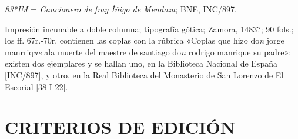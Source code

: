 \documentclass[11pt,a4paper,twoside]{article}
\newcommand{\comillas}[1]{«#1»}
\begin{document}
\textit{83*IM} = \textit{Cancionero de fray Íñigo de Mendoza}; BNE, INC/897.

Impresión incunable a doble columna; tipografía gótica; Zamora, 1483?; 90 fols.; los ff. 67r.-70r. contienen las coplas con la rúbrica \comillas{Coplas que hizo do\textit{n} jorge manrriq\textit{ue} ala muerte del maestre de santiago do\textit{n} rodrigo manrique su padre}; existen dos ejemplares y se hallan uno, en la Biblioteca Nacional de España [INC/897], y otro, en la Real Biblioteca del Monasterio de San Lorenzo de El Escorial [38-I-22].

\section*{{\fontsize{13}{14.35}\selectfont CRITERIOS DE EDICIÓN}}
\end{document}
